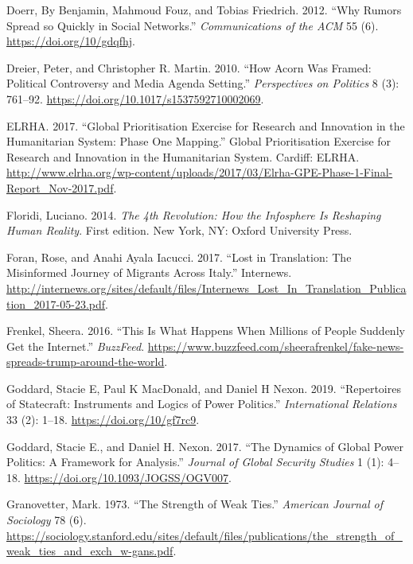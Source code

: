 \documentclass[
]{article}
\newlength{\cslhangindent}
\newenvironment{cslreferences}%
  {\setlength{\parindent}{0pt}%
  \everypar{\setlength{\hangindent}{\cslhangindent}}\ignorespaces}%
  {\par}
\begin{document}
\begin{cslreferences}
\leavevmode\hypertarget{ref-Doerr2012Why}{}%
Doerr, By Benjamin, Mahmoud Fouz, and Tobias Friedrich. 2012. ``Why
Rumors Spread so Quickly in Social Networks.'' \emph{Communications of
the ACM} 55 (6). \url{https://doi.org/10/gdqfhj}.

\leavevmode\hypertarget{ref-Dreier2010How}{}%
Dreier, Peter, and Christopher R. Martin. 2010. ``How Acorn Was Framed:
Political Controversy and Media Agenda Setting.'' \emph{Perspectives on
Politics} 8 (3): 761--92.
\url{https://doi.org/10.1017/s1537592710002069}.

\leavevmode\hypertarget{ref-ELRHA2017Global}{}%
ELRHA. 2017. ``Global Prioritisation Exercise for Research and
Innovation in the Humanitarian System: Phase One Mapping.'' Global
Prioritisation Exercise for Research and Innovation in the Humanitarian
System. Cardiff: ELRHA.
\url{http://www.elrha.org/wp-content/uploads/2017/03/Elrha-GPE-Phase-1-Final-Report_Nov-2017.pdf}.

\leavevmode\hypertarget{ref-Floridi20144th}{}%
Floridi, Luciano. 2014. \emph{The 4th Revolution: How the Infosphere Is
Reshaping Human Reality}. First edition. New York, NY: Oxford University
Press.

\leavevmode\hypertarget{ref-Foran2017Lost}{}%
Foran, Rose, and Anahi Ayala Iacucci. 2017. ``Lost in Translation: The
Misinformed Journey of Migrants Across Italy.'' Internews.
\url{http://internews.org/sites/default/files/Internews_Lost_In_Translation_Publication_2017-05-23.pdf}.

\leavevmode\hypertarget{ref-Frenkel2016This}{}%
Frenkel, Sheera. 2016. ``This Is What Happens When Millions of People
Suddenly Get the Internet.'' \emph{BuzzFeed}.
\url{https://www.buzzfeed.com/sheerafrenkel/fake-news-spreads-trump-around-the-world}.

\leavevmode\hypertarget{ref-Goddard2019Repertoires}{}%
Goddard, Stacie E, Paul K MacDonald, and Daniel H Nexon. 2019.
``Repertoires of Statecraft: Instruments and Logics of Power Politics.''
\emph{International Relations} 33 (2): 1--18.
\url{https://doi.org/10/gf7rc9}.

\leavevmode\hypertarget{ref-Goddard2017Dynamics}{}%
Goddard, Stacie E., and Daniel H. Nexon. 2017. ``The Dynamics of Global
Power Politics: A Framework for Analysis.'' \emph{Journal of Global
Security Studies} 1 (1): 4--18.
\url{https://doi.org/10.1093/JOGSS/OGV007}.

\leavevmode\hypertarget{ref-Granovetter1973Strength}{}%
Granovetter, Mark. 1973. ``The Strength of Weak Ties.'' \emph{American
Journal of Sociology} 78 (6).
\url{https://sociology.stanford.edu/sites/default/files/publications/the_strength_of_weak_ties_and_exch_w-gans.pdf}.


\end{cslreferences}
\end{document}
